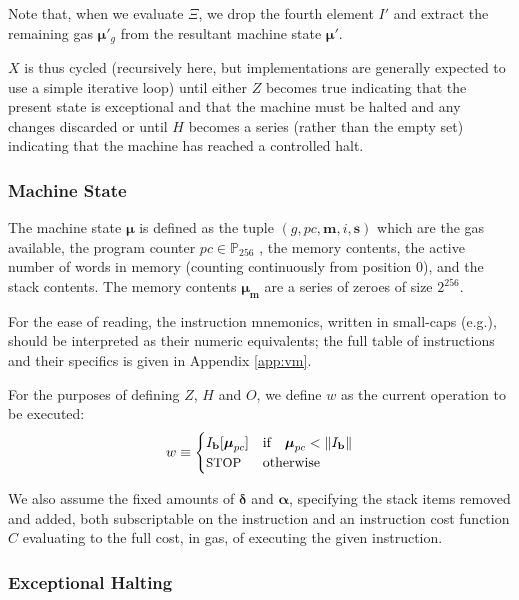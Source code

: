 \documentclass[9pt,oneside]{amsart}
\makeatletter
\newcommand*\eg{e.g.\@\xspace}
\makeatother
\begin{document}
\begin{multicols}{2}
Note that, when we evaluate $\Xi$, we drop the fourth element $I'$ and extract the remaining gas $\boldsymbol{\mu}'_g$ from the resultant machine state $\boldsymbol{\mu}'$.

$X$ is thus cycled (recursively here, but implementations are generally expected to use a simple iterative loop) until either $Z$ becomes true indicating that the present state is exceptional and that the machine must be halted and any changes discarded or until $H$ becomes a series (rather than the empty set) indicating that the machine has reached a controlled halt.

\subsubsection{Machine State}
The machine state $\boldsymbol{\mu}$ is defined as the tuple $(g, pc, \mathbf{m}, i, \mathbf{s})$ which are the gas available, the program counter $pc \in \mathbb{P}_{256}$ , the memory contents, the active number of words in memory (counting continuously from position 0), and the stack contents. The memory contents $\boldsymbol{\mu}_\mathbf{m}$ are a series of zeroes of size $2^{256}$.

For the ease of reading, the instruction mnemonics, written in small-caps (\eg {}), should be interpreted as their numeric equivalents; the full table of instructions and their specifics is given in Appendix \ref{app:vm}.

For the purposes of defining $Z$, $H$ and $O$, we define $w$ as the current operation to be executed:
\begin{equation}\label{eq:currentoperation}
w \equiv \begin{cases} I_\mathbf{b}[\boldsymbol{\mu}_{pc}] & \text{if} \quad \boldsymbol{\mu}_{pc} < \lVert I_\mathbf{b} \rVert \\
\text{\small STOP} & \text{otherwise}
\end{cases}
\end{equation}

We also assume the fixed amounts of $\mathbf{\delta}$ and $\mathbf{\alpha}$, specifying the stack items removed and added, both subscriptable on the instruction and an instruction cost function $C$ evaluating to the full cost, in gas, of executing the given instruction.

\subsubsection{Exceptional Halting}


\end{multicols}
\end{document}
